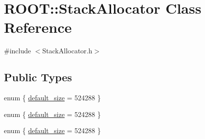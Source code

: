 \hypertarget{classROOT_1_1Minuit2_1_1StackAllocator}{}\section{R\+O\+OT\+:\+:Stack\+Allocator Class Reference}
\label{classROOT_1_1Minuit2_1_1StackAllocator}


{\ttfamily \#include $<$Stack\+Allocator.\+h$>$}

\subsection*{Public Types}
\begin{DoxyCompactItemize}
\item 
enum \{ \mbox{\hyperlink{classROOT_1_1Minuit2_1_1StackAllocator_a15e330c0474ef3075767d4e5c2e74d27a308d739070cf62de267a1793a45142e8}{default\+\_\+size}} = 524288
 \}
\item 
enum \{ \mbox{\hyperlink{classROOT_1_1Minuit2_1_1StackAllocator_a15e330c0474ef3075767d4e5c2e74d27a308d739070cf62de267a1793a45142e8}{default\+\_\+size}} = 524288
 \}
\item 
enum \{ \mbox{\hyperlink{classROOT_1_1Minuit2_1_1StackAllocator_a15e330c0474ef3075767d4e5c2e74d27a308d739070cf62de267a1793a45142e8}{default\+\_\+size}} = 524288
 \}
\end{DoxyCompactItemize}
